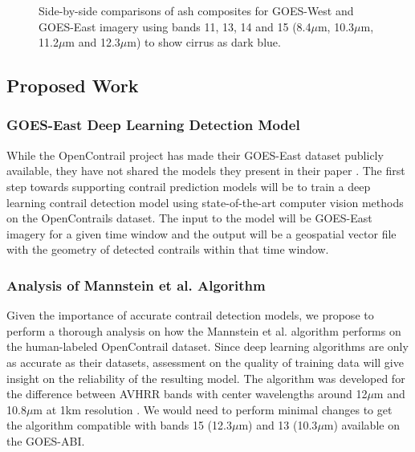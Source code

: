 \begin{figure}
\caption{Side-by-side comparisons of ash composites for GOES-West and GOES-East imagery using bands 11, 13, 14 and 15 (8.4\(\mu\)m, 10.3\(\mu\)m, 11.2\(\mu\)m and 12.3\(\mu\)m) to show cirrus as dark blue.}
\label{goes_img}
\end{figure}

\subsection{Proposed Work}

\subsubsection{GOES-East Deep Learning Detection Model}
While the OpenContrail project has made their GOES-East dataset publicly available, they have not shared the models they present in their paper \cite{opencontrails}. The first step towards supporting contrail prediction models will be to train a deep learning contrail detection model using state-of-the-art computer vision methods on the OpenContrails dataset. The input to the model will be GOES-East imagery for a given time window and the output will be a geospatial vector file with the geometry of detected contrails within that time window.

\subsubsection{Analysis of Mannstein et al. Algorithm}
Given the importance of accurate contrail detection models, we propose to perform a thorough analysis on how the Mannstein et al. algorithm performs on the human-labeled OpenContrail dataset. Since deep learning algorithms are only as accurate as their datasets, assessment on the quality of training data will give insight on the reliability of the resulting model. The algorithm was developed for the difference between AVHRR bands with center wavelengths around 12\(\mu\)m and 10.8\(\mu\)m at 1km resolution \cite{mannstein}. We would need to perform minimal changes to get the algorithm compatible with bands 15 (12.3\(\mu\)m) and 13 (10.3\(\mu\)m) available on the GOES-ABI.

